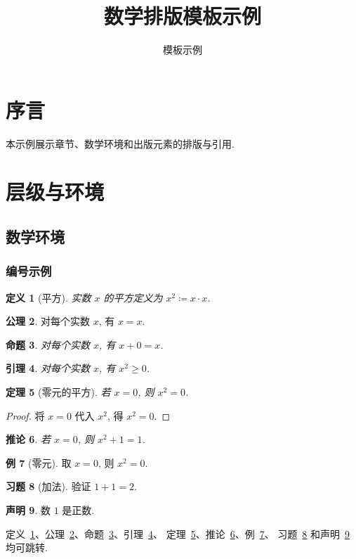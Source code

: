 \documentclass[UTF8,12pt,oneside,fontset=fandol,notitlepage]{ctexart}
\theoremstyle{mtfang}
\newtheorem{theorem}{定理}[section]
\newtheorem{definition}[theorem]{定义}
\newtheorem{proposition}[theorem]{命题}
\newtheorem{lemma}[theorem]{引理}
\newtheorem{corollary}[theorem]{推论}
\theoremstyle{definition}
\newtheorem{claim}[theorem]{声明}
\newtheorem{axiom}[theorem]{公理}
\theoremstyle{definition}
\newtheorem{example}[theorem]{例}
\newtheorem{exercise}[theorem]{习题}
\begin{document}
\title{数学排版模板示例}
\author{模板示例}
\date{}
\maketitle
\section*{序言}
本示例展示章节、数学环境和出版元素的排版与引用.
\newpage
\tableofcontents
\newpage

\section{层级与环境}\label{sec:env}
\subsection{数学环境}
\subsubsection{编号示例}
\begin{definition}[平方]\label{def:square}
    实数 $x$ 的平方定义为 $x^2 \coloneqq x \cdot x$.
\end{definition}
\begin{axiom}\label{ax:one}
    对每个实数 $x$, 有 $x = x$.
\end{axiom}
\begin{proposition}\label{prop:one}
    对每个实数 $x$, 有 $x + 0 = x$.
\end{proposition}
\begin{lemma}\label{lem:one}
    对每个实数 $x$, 有 $x^2 \geq 0$.
\end{lemma}
\begin{theorem}[零元的平方]\label{thm:one}
    若 $x = 0$, 则 $x^2 = 0$.
\end{theorem}
\begin{proof}
    将 $x = 0$ 代入 $x^2$, 得 $x^2 = 0$.
\end{proof}
\begin{corollary}\label{cor:one}
    若 $x = 0$, 则 $x^2 + 1 = 1$.
\end{corollary}
\begin{example}[零元]\label{ex:one}
    取 $x = 0$, 则 $x^2 = 0$.
\end{example}
\begin{exercise}[加法]\label{exercise:one}
    验证 $1 + 1 = 2$.
\end{exercise}
\begin{claim}\label{claim:one}
    数 $1$ 是正数.
\end{claim}
定义~\ref{def:square}、公理~\ref{ax:one}、命题~\ref{prop:one}、引理~\ref{lem:one}、
定理~\ref{thm:one}、推论~\ref{cor:one}、例~\ref{ex:one}、
习题~\ref{exercise:one} 和声明~\ref{claim:one} 均可跳转.
\end{document}
